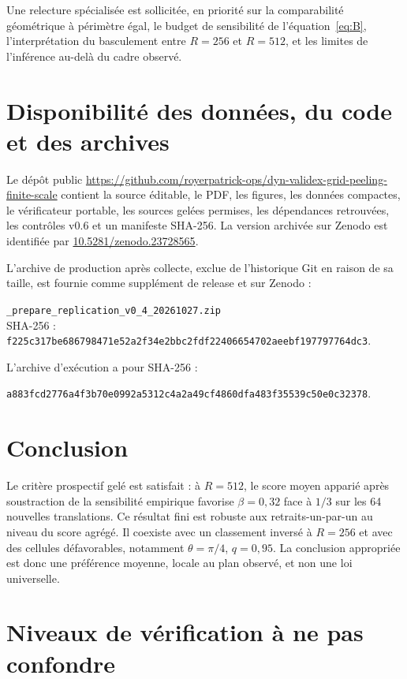 \documentclass[11pt,a4paper]{article}
\newcommand{\versiondoi}{10.5281/zenodo.23728565}
\newcommand{\repo}{https://github.com/royerpatrick-ops/dyn-validex-grid-peeling-finite-scale}
\newcommand{\code}[1]{\texttt{#1}}
\newcommand{\sha}[1]{{\small\ttfamily\nolinkurl{#1}}}
\begin{document}
Une relecture spécialisée est sollicitée, en priorité sur la comparabilité géométrique à périmètre égal, le budget de sensibilité de l'équation~\eqref{eq:B}, l'interprétation du basculement entre $R=256$ et $R=512$, et les limites de l'inférence au-delà du cadre observé.

\section{Disponibilité des données, du code et des archives}

Le dépôt public \href{\repo}{\repo} contient la source éditable, le PDF, les figures, les données compactes, le vérificateur portable, les sources gelées permises, les dépendances retrouvées, les contrôles v0.6 et un manifeste SHA-256. La version archivée sur Zenodo est identifiée par \href{https://doi.org/\versiondoi}{\versiondoi}.

L'archive de production après collecte, exclue de l'historique Git en raison de sa taille, est fournie comme supplément de release et sur Zenodo :
\begin{center}
\small
\code{\_prepare\_replication\_v0\_4\_20261027.zip}\\
SHA-256 : \sha{f225c317be686798471e52a2f34e2bbc2fdf22406654702aeebf197797764dc3}.
\end{center}
L'archive d'exécution a pour SHA-256 :
\begin{center}
\sha{a883fcd2776a4f3b70e0992a5312c4a2a49cf4860dfa483f35539c50e0c32378}.
\end{center}

\section{Conclusion}

Le critère prospectif gelé est satisfait : à $R=512$, le score moyen apparié après soustraction de la sensibilité empirique favorise $\beta=0{,}32$ face à $1/3$ sur les 64 nouvelles translations. Ce résultat fini est robuste aux retraits-un-par-un au niveau du score agrégé. Il coexiste avec un classement inversé à $R=256$ et avec des cellules défavorables, notamment $\theta=\pi/4$, $q=0{,}95$. La conclusion appropriée est donc une préférence moyenne, locale au plan observé, et non une loi universelle.




\appendix
\section{Niveaux de vérification à ne pas confondre}
\end{document}
